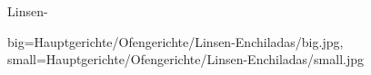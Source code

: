 \renewcommand*{\ingredients}[2][\empty]
{%
    \def\xcb@ingredientslines{#1}
    \def\xcb@ingredients
    {%
        \xcb@name@inghead
        \\[1em]
        {\xcb@fontsize@ing\color{\xcb@color@ing}
        \begin{supertabular}{r>{\raggedright\arraybackslash}p{3cm}}
            #2
        \end{supertabular}}
    }
}
\makeatother

\begin{recipeDP}
    [
        preparationtime = {\SI{60}{\minute}},
        bakingtime = {\SI{25}{\minute}},
        bakingtemperature = {\protect\bakingtemperature{topbottomheat=\SI{200}{\celsius}}},
        portion = {12 Enchiladas},
        source = {@elavegan}
    ]
    {Linsen-}

    \graph
        {
            big=Hauptgerichte/Ofengerichte/Linsen-Enchiladas/big.jpg,
            small=Hauptgerichte/Ofengerichte/Linsen-Enchiladas/small.jpg
        }



\end{recipeDP}

